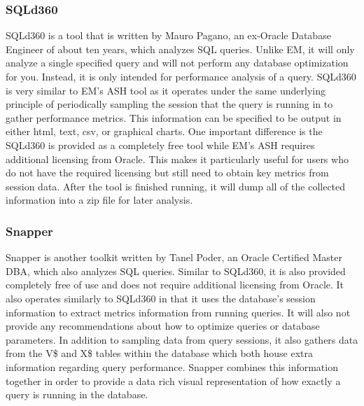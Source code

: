 \documentclass[draftclsnofoot, onecolumn, compsoc, 10pt]{IEEEtran}
\begin{document}
\subsubsection{SQLd360}
SQLd360 is a tool that is written by Mauro Pagano, an ex-Oracle Database Engineer of about ten years, which analyzes SQL queries.
Unlike EM, it will only analyze a single specified query and will not perform any database optimization for you.  
Instead, it is only intended for performance analysis of a query. 
SQLd360 is very similar to EM’s ASH tool as it operates under the same underlying principle of periodically sampling the session that the query is running in to gather performance metrics. 
This information can be specified to be output in either html, text, csv, or graphical charts. One important difference is the SQLd360 is provided as a completely free tool while EM’s ASH requires additional licensing from Oracle. 
This makes it particularly useful for users who do not have the required licensing but still need to obtain key metrics from session data. 
After the tool is finished running, it will dump all of the collected information into a zip file for later analysis.

\subsubsection{Snapper}
Snapper is another toolkit written by Tanel Poder, an Oracle Certified Master DBA, which also analyzes SQL queries. 
Similar to SQLd360, it is also provided completely free of use and does not require additional licensing from Oracle. 
It also operates similarly to SQLd360 in that it uses the database’s session information to extract metrics information from running queries. 
It will also not provide any recommendations about how to optimize queries or database parameters. 
In addition to sampling data from query sessions, it also gathers data from the V\$ and X\$ tables within the database which both house extra information regarding query performance. 
Snapper combines this information together in order to provide a data rich visual representation of how exactly a query is running in the database. 
\end{document}

